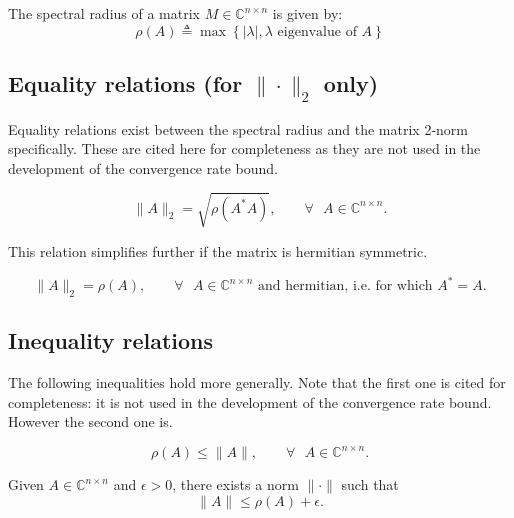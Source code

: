 \documentclass{article}
\begin{document}
\begin{defn}
The spectral radius of a matrix $M\in \mathds{C}^{n\times n}$ is given by:
\[
	\rho(A) \triangleq \max \left\{ |\lambda|, \lambda \text{ eigenvalue of }A\right\}
\]
\end{defn}

\subsection*{Equality relations (for $\| \cdot \|_2$ only)}
Equality relations exist between the spectral radius and the matrix 2-norm specifically. These are cited here for completeness as they are not used in the development of the convergence rate bound.
\begin{thm}
\label{th_eq_sprad_m2nrm}
\[
	\|A\|_2 = \sqrt{\rho(A^*A)}, \qquad \forall \text{ } A \in \mathds{C}^{n\times n}. 
\]
\end{thm}
\par This relation simplifies further if the matrix is hermitian symmetric.
\begin{thm}
\[
	\|A\|_2 = \rho(A), \qquad \forall \text{ } A \in \mathds{C}^{n\times n} \text{ and  hermitian, i.e. for which } A^*=A.
\]
\end{thm}

\subsection*{Inequality relations}
\par The following inequalities hold more generally. Note that the first one is cited for completeness: it is not used in the development of the convergence rate bound. However the second one is.
\begin{thm}
\[
	\rho(A) \le \|A\|, \qquad \forall \text{ } A \in \mathds{C}^{n\times n}.
\]
\end{thm}

\begin{thm} Given $A\in \mathds{C}^{n\times n}$ and $\epsilon>0$, there exists a norm $\|\cdot \|$ such that
\label{th_mnrm_ubound}
\[
	\|A\| \le \rho(A) + \epsilon.
\]
\end{thm}

\pagebreak


\end{document}
